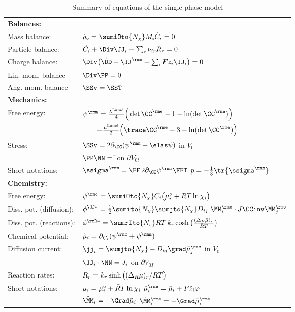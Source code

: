 \begin{table}[H]
  \centering
  \caption{Summary of equations of the single phase model}
  \begin{tabular}{| l l |}
    \hline
    \bf Balances: & \\
    Mass balance: & $\dot\rho_\circ=\sumiOto{\Nchi} M_i \dot C_i = 0$ \\
    Particle balance: & $ \dot C_i + \Div\JJ_i - \sum_r \nuir R_r = 0$  \\
    Charge balance: & $\Div\big(\dot\DD-\JJe+\sum_i Fz_i\JJ_i\big) = 0$ \\
    Lin. mom. balance & $\Div\PP=0$ \\
    Ang. mom. balance & $\SSv=\SST$ \\
    \hline
    \bf Mechanics: & \\
    Free energy: & $\psim = \frac{\lambda^{\text{Lam\'e}}}{4}\Big(\det\CCe-1-\ln(\det\CCe)\Big)$  \\
    & $ \qquad + \frac{\mu^{\text{Lam\'e}}}{2}\Big(\trace\CCe-3-\ln(\det\CCe)\Big)$ \\
    Stress:  & $\SSv = 2\dCC(\psim+\psie)$ \quad in $V_0$ \\
    & $\PP\NN=\bar\tt$ \quad on $\partial V_{0t}$ \\
    Short notations:  & $\ssigmam = \FF\,2\dCC\psim\FFT$ \qquad $p = -\frac{1}{3}\tr{\ssigmam}$ \\
    \hline
    \bf Chemistry: & \\
    Free energy: & $\psic =  \sumiOto{\Nchi} C_i \big(\munord_i + \RT\ln\chii \big)$ \\
    Diss. pot. (diffusion): & $\phiJJs= \frac{1}{2} \sumito{\Nchi}\sumjto{\Nchi} \Dij \ \MMetilde_i \cdot J\CCinv \MMetilde_j$\\
    Diss. pot. (reactions): & $ \phiRs= \sumrIto{N_r} \RT \,k_r\cosh\big(\frac{(\Delta_R\tilde\mu)_r}{\RT}\big) $  \\
    Chemical potential: & $\tilde\mu_i = \dCi(\psic+\psim)$ \\
    Diffusion current: & $\jj_i = \sumjto{\Nchi} -\Dij\grad\muetilde_j $ \quad in $V_0$ \\
    & $\JJ_i\cdot\NN = J_i$ \quad on $\partial V_{0I}$ \\
    Reaction rates: & $R_r = k_r \sinh\big((\Delta_R\mu)_r/\bar{R}T \big)$ \\
    Short notations: & $\mu_i = \mu^{\circ}_i + \bar{R}T\ln\chi_{i}$ \qquad $\muetilde_i = \tilde\mu_i + F\tilde z_i \varphi$ \\
    & $\tilde\MM_i = -\Grad\tilde\mu_i$ $\MMetilde_i = -\Grad\muetilde_i$ \\

\end{tabular}
\end{table}
